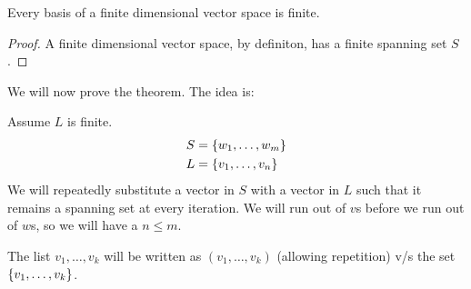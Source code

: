 
\begin{cor} \label{cor:finite basis}
    Every basis of a finite dimensional vector space is finite.
\end{cor}
\begin{proof}
    A finite dimensional vector space, by definiton, has a finite spanning set $S$. 
\end{proof}

We will now prove the theorem. The idea is:

Assume $L$ is finite.
\begin{align*}
    S &= \set{w_{1}, \dots, w_{m}} \\
    L &= \set{v_{1}, \dots, v_{n}}
\end{align*}
We will repeatedly substitute a vector in $S$ with a vector in $L$ such that it remains a spanning set at every iteration.
We will run out of $v$s before we run out of $w$s, so we will have a $n \leq m$.

\begin{rem}
    The list $v_{1}, \dots, v_{k}$ will be written as $(v_{1}, \dots, v_{k})$ (allowing repetition) v/s the set $\set{v_{1}, \dots, v_{k}}$.
\end{rem}

